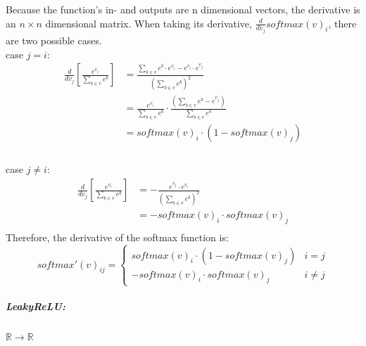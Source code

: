 \documentclass[12pt]{article}
\begin{document}
Because the function's in- and outputs are n dimensional vectors, the derivative is an \(n\times n\) dimensional matrix. When taking its derivative, \(\frac{d}{dv_j}softmax(v)_i\), there are two possible cases. 
\\\indent case \(j = i\):
\begin{align*}
\frac{d}{dv_j}\left[\frac{e^{v_i}}{\sum_{b\in v} e^{b}}\right]
&= \frac{\sum_{b \in v}e^b \cdot e^{v_i}-e^{v_i}\cdot e^{v_j}}{(\sum_{b \in v}e^b)^2}\\
&= \frac{e^{v_i}}{\sum_{b\in v}e^b}\cdot \frac{\left(\sum_{b \in v} e^b - e^{v_j}\right)}{\sum_{b \in v} e^b}\\
&= softmax(v)_i\cdot (1 - softmax(v)_j)\\
\end{align*}
\\\indent case \(j \neq i\):
\begin{align*}
\frac{d}{dv_j}\left[\frac{e^{v_i}}{\sum_{b\in v} e^{b}}\right] 
&= -\frac{e^{v_j}\cdot e^{v_i}}{\left(\sum_{b \in v}e^b\right)^2} \\
&= -softmax(v)_i\cdot softmax(v)_j \\
\end{align*}
Therefore, the derivative of the softmax function is:
\begin{equation}\label{eq:NN:softmax_derivative}
softmax'(v)_{ij} = \left\{
\begin{array}{ll}
 softmax(v)_i\cdot (1-softmax(v)_j) & i = j\\
 - softmax(v)_i \cdot softmax(v)_j     & i \neq j
\end{array}
\right.
\end{equation}
\subparagraph*{LeakyReLU:}\(\mathbb{R} \to \mathbb{R}\)
\begin{center}

\end{center}
\end{document}
